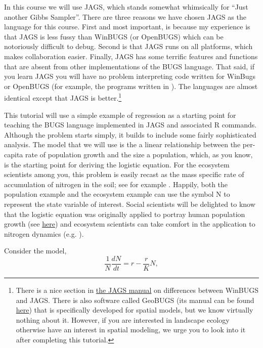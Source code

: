 \documentclass[12pt,english]{article}
\begin{document}
In this course we will use JAGS, which stands somewhat whimsically for \enquote{Just another Gibbs Sampler}. There are three reasons we have chosen JAGS as the language for this course. First and most important, is because my experience is that JAGS is less fussy than WinBUGS (or OpenBUGS) which can be notoriously difficult to debug. Second is that JAGS runs on all platforms, which makes collaboration easier. Finally, JAGS has some terrific features and functions that are absent from other implementations of the BUGS language. That said, if you learn JAGS you will have no problem interpreting code written for WinBugs or OpenBUGS (for example, the programs written in \citealt{McCarthy_Bayes_book}). The languages are almost identical except that JAGS is better.\footnote{There is a nice section in \href{https://sourceforge.net/projects/mcmc-jags/files/Manuals/4.x/}{the JAGS manual} on differences between WinBUGS and JAGS. There is also software called GeoBUGS (its manual can be found \href{http://www.mrc-bsu.cam.ac.uk/bugs/winbugs/contents.shtml}{here}) that is specifically developed for spatial models, but we know virtually nothing about it. However, if you are interested in landscape ecology otherwise have an interest in spatial modeling, we urge you to look into it after completing this tutorial.}

\newpage 

This tutorial will use a simple example of regression as a starting point for teaching the BUGS language implemented in JAGS and associated R commands. Although the problem starts simply, it builds to include some fairly sophisticated analysis. The model that we will use is the a linear relationship between the per-capita rate of population growth and the size a population, which, as you know, is the starting point for deriving the logistic equation. For the ecosystem scientists among you, this problem is easily recast as the mass specific rate of accumulation of nitrogen in the soil; see for example \citet{Knops_Tilman}. Happily, both the population example and the ecosystem example can use the symbol N to represent the state variable of interest. Social scientists will be delighted to know that the logistic equation was originally applied to portray human population growth (see \href{http://monkeysuncle.stanford.edu/?p=933}{here}) and ecosystem scientists can take comfort in the application to nitrogen dynamics (e.g. \citealt{Knops_Tilman}). 

Consider the model,
\begin{equation}
\frac{1}{N}\frac{dN}{dt}=r-\frac{r}{K}N,
\end{equation}
\end{document}
